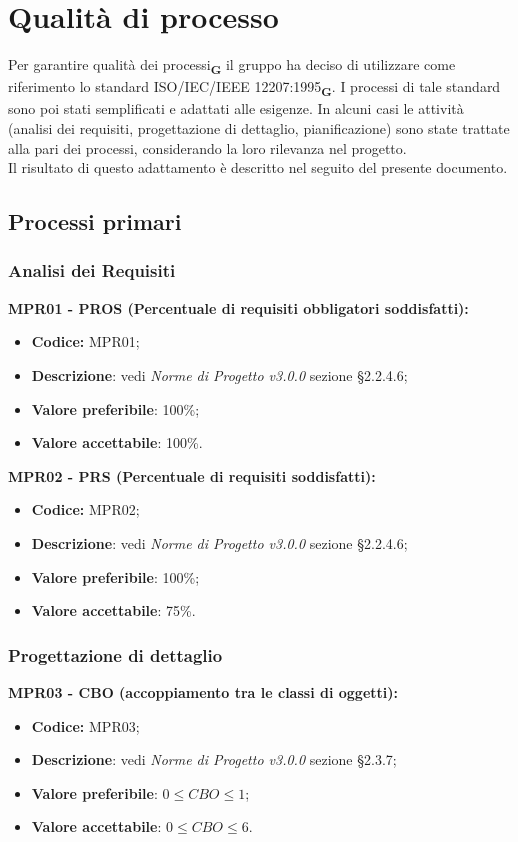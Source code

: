 \section{Qualità di processo}
Per garantire qualità dei processi\textsubscript{\textbf{G}} il gruppo ha deciso di utilizzare come riferimento lo standard ISO/IEC/IEEE 12207:1995\textsubscript{\textbf{G}}.
I processi di tale standard sono poi stati semplificati e adattati alle esigenze. 
In alcuni casi le attività (analisi dei requisiti, progettazione di dettaglio, pianificazione) sono state trattate alla pari dei processi, considerando la loro rilevanza nel progetto.\\Il risultato di questo adattamento è descritto nel seguito del presente documento.
\subsection{Processi primari}
\subsubsection{Analisi dei Requisiti}
\textbf{MPR01 - PROS (Percentuale di requisiti obbligatori soddisfatti):}
\begin{itemize}
    \item \textbf{Codice:} MPR01;
    \item \textbf{Descrizione}: vedi \textit{Norme di Progetto v3.0.0} sezione \S 2.2.4.6;
    \item \textbf{Valore preferibile}: 100\%;
    \item \textbf{Valore accettabile}: 100\%.
\end{itemize}
\textbf{MPR02 - PRS (Percentuale di requisiti soddisfatti):}
\begin{itemize}
    \item \textbf{Codice:} MPR02;
    \item \textbf{Descrizione}: vedi \textit{Norme di Progetto v3.0.0} sezione \S 2.2.4.6;
    \item \textbf{Valore preferibile}: 100\%;
    \item \textbf{Valore accettabile}: 75\%.
\end{itemize}
\subsubsection{Progettazione di dettaglio}
\textbf{MPR03 - CBO (accoppiamento tra le classi di oggetti):}
\begin{itemize}
    \item \textbf{Codice:} MPR03;
    \item \textbf{Descrizione}: vedi \textit{Norme di Progetto v3.0.0} sezione \S 2.3.7;
    \item \textbf{Valore preferibile}: $0 \leq CBO \leq 1$;
    \item \textbf{Valore accettabile}: $0 \leq CBO \leq 6$.
\end{itemize}
